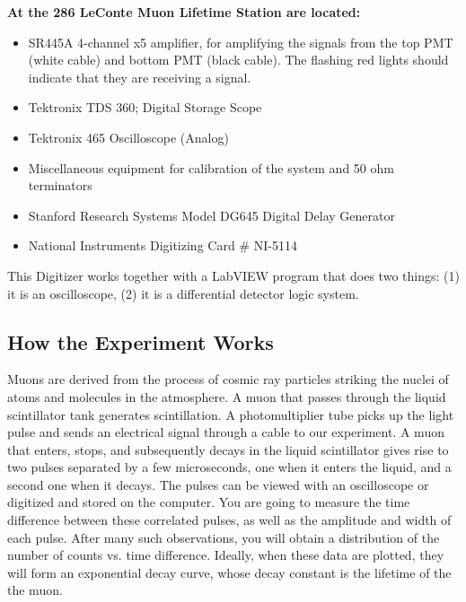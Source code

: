 \documentclass{../lab}
\begin{document}
\noindent\textbf{At the 286 LeConte Muon Lifetime Station are located:}

\begin{itemize}
    \item SR445A 4-channel x5 amplifier, for amplifying the signals from the top PMT (white cable) and bottom PMT (black cable). The flashing red lights should indicate that they are receiving a signal.

    \item Tektronix TDS 360; Digital Storage Scope

    \item Tektronix 465 Oscilloscope (Analog)

    \item Miscellaneous equipment for calibration of the system and 50 ohm terminators

    \item Stanford Research Systems Model DG645 Digital Delay Generator

    \item National Instruments Digitizing Card \# NI-5114

\end{itemize}

\noindent This Digitizer works together with a LabVIEW program that does two things: (1) it is an oscilloscope, (2) it is a differential detector logic system.

\subsection{How the Experiment Works}

Muons are derived from the process of cosmic ray particles striking the nuclei of atoms and molecules in the atmosphere. A muon that passes through the liquid scintillator tank generates scintillation. A photomultiplier tube picks up the light pulse and sends an electrical signal through a cable to our experiment. A muon that enters, stops, and subsequently decays in the liquid scintillator gives rise to two pulses separated by a few microseconds, one when it enters the liquid, and a second one when it decays. The pulses can be viewed with an oscilloscope or digitized and stored on the computer. You are going to measure the time difference between these correlated pulses, as well as the amplitude and width of each pulse. After many such observations, you will obtain a distribution of the number of counts vs. time difference. Ideally, when these data are plotted, they will form an exponential decay curve, whose decay constant is the lifetime of the the muon.
\end{document}
